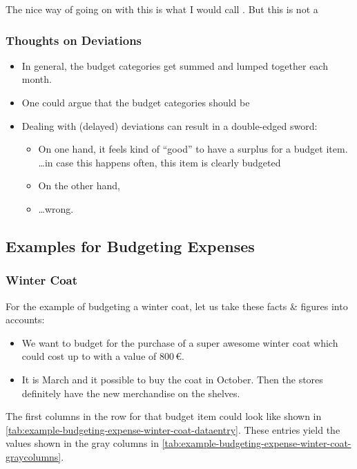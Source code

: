 The nice way of going on with this is what I would call .
But this is not a 

\subsubsection{Thoughts on Deviations}
\label{subsubsec:thoughts-deviations}

\begin{itemize}
	\item In general, the budget categories get summed and lumped together each month.
	\item One could argue that the budget categories should be 
	\item Dealing with (delayed) deviations can result in a double-edged sword:
	\begin{itemize}
		\item On one hand, it feels kind of ``good'' to have a surplus for a budget item.\\
		\ldots in case this happens often, this item is clearly budgeted
		\item On the other hand, 
		\item \ldots wrong.
	\end{itemize}
\end{itemize}

\subsection{Examples for Budgeting Expenses}
\label{subsec:examples-budgeting-expenses}

\subsubsection{Winter Coat}
\label{subsubsec:example-budgeting-expense-winter-coat}

For the example of budgeting a winter coat, let us take these facts \& figures into accounts:
\begin{itemize}
	\item We want to budget for the purchase of a super awesome winter coat which could cost up to with a value of 800\,€.
	\item It is March and it possible to buy the coat in October.
	Then the stores definitely have the new merchandise on the shelves.
\end{itemize}
The first columns in the row for that budget item could look like shown in \autoref{tab:example-budgeting-expense-winter-coat-dataentry}.
These entries yield the values shown in the gray columns in \autoref{tab:example-budgeting-expense-winter-coat-graycolumns}.


